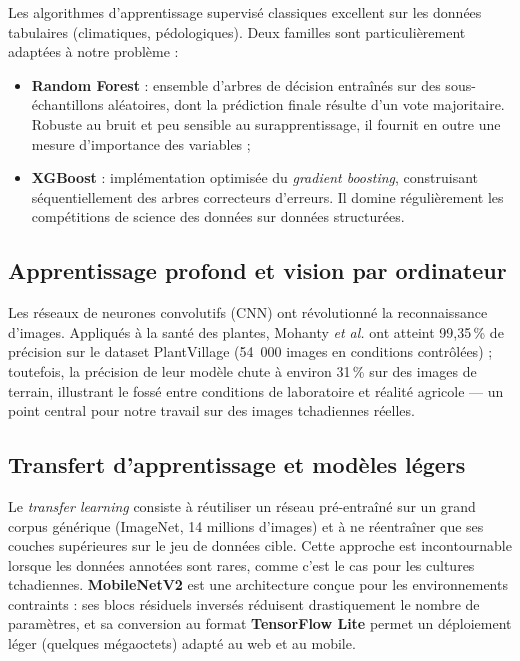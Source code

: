 Les algorithmes d'apprentissage supervisé classiques excellent
sur les données tabulaires (climatiques, pédologiques). Deux
familles sont particulièrement adaptées à notre problème :

\begin{itemize}[leftmargin=1.2cm]
	\item \textbf{Random Forest} \cite{breiman2001random} :
	ensemble d'arbres de décision entraînés sur des
	sous-échantillons aléatoires, dont la prédiction finale
	résulte d'un vote majoritaire. Robuste au bruit et peu
	sensible au surapprentissage, il fournit en outre une
	mesure d'importance des variables ;
	\item \textbf{XGBoost} \cite{chen2016xgboost} : implémentation
	optimisée du \textit{gradient boosting}, construisant
	séquentiellement des arbres correcteurs d'erreurs.
	Il domine régulièrement les compétitions de science des
	données sur données structurées.
\end{itemize}

\subsection{Apprentissage profond et vision par ordinateur}

Les réseaux de neurones convolutifs (CNN) ont révolutionné la
reconnaissance d'images. Appliqués à la santé des plantes,
Mohanty \textit{et al.} \cite{mohanty2016deep} ont atteint
99,35\,\% de précision sur le dataset PlantVillage (54~000
images en conditions contrôlées) ; toutefois, la précision de
leur modèle chute à environ 31\,\% sur des images de terrain,
illustrant le fossé entre conditions de laboratoire et réalité
agricole --- un point central pour notre travail sur des images
tchadiennes réelles.

\subsection{Transfert d'apprentissage et modèles légers}

Le \textit{transfer learning} consiste à réutiliser un réseau
pré-entraîné sur un grand corpus générique (ImageNet, 14
millions d'images) et à ne réentraîner que ses couches
supérieures sur le jeu de données cible. Cette approche est
incontournable lorsque les données annotées sont rares, comme
c'est le cas pour les cultures tchadiennes.
\textbf{MobileNetV2} \cite{sandler2018mobilenetv2} est une
architecture conçue pour les environnements contraints :
ses blocs résiduels inversés réduisent drastiquement le nombre
de paramètres, et sa conversion au format \textbf{TensorFlow
	Lite} permet un déploiement léger (quelques mégaoctets) adapté
au web et au mobile.

